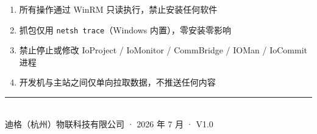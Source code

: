 \documentclass[12pt,a4paper]{ctexart}
\newcommand{\code}[1]{\texttt{\small #1}}
\begin{document}
\begin{enumerate}[leftmargin=*]
  \item 所有操作通过 WinRM 只读执行，禁止安装任何软件
  \item 抓包仅用 \code{netsh trace}（Windows 内置），零安装零影响
  \item 禁止停止或修改 IoProject / IoMonitor / CommBridge / IOMan / IoCommit 进程
  \item 开发机与主站之间仅单向拉取数据，不推送任何内容
\end{enumerate}

\vspace{1cm}

\begin{center}
\rule{0.5\textwidth}{0.4pt}\\[6pt]
{\small 迪格（杭州）物联科技有限公司 · 2026 年 7 月 · V1.0}
\end{center}
\end{document}
